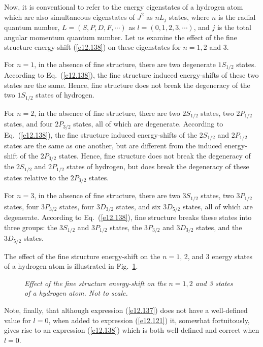 Now, it is conventional to refer to the energy eigenstates of a hydrogen
atom which are also simultaneous eigenstates of $J^2$ as $nL_j$ states,
where $n$ is the radial quantum number, $L=(S,P,D,F,\cdots)$ as $l=(0,1,2,3,\cdots)$, and $j$ is the total angular momentum quantum number.
Let us examine the effect of the fine structure energy-shift (\ref{e12.138})
on these eigenstates for  $n=1,2$ and 3.

For $n=1$, in the absence of fine structure, there are two degenerate $1S_{1/2}$ states. 
According to Eq.~(\ref{e12.138}), the fine structure induced energy-shifts of
these two states are the same. Hence, fine structure does not
break the degeneracy of the two $1S_{1/2}$ states of hydrogen. 

For $n=2$, in the absence of fine structure, there are two $2S_{1/2}$
states, two $2P_{1/2}$ states, and four $2P_{3/2}$ states, all
of which are degenerate.
According to Eq.~(\ref{e12.138}), the fine structure induced energy-shifts of
the $2S_{1/2}$ and $2P_{1/2}$ states are the same as one another, but are different
from the  induced
energy-shift of the $2P_{3/2}$ states.
Hence, fine structure does not break the
degeneracy of the $2S_{1/2}$ and $2P_{1/2}$ states of hydrogen, but
does break the degeneracy of these states relative to the $2P_{3/2}$
states.

 For $n=3$, in the absence of fine structure, there are two $3S_{1/2}$
states, two $3P_{1/2}$ states, four $3P_{3/2}$ states,  four $3D_{3/2}$
states, and six $3D_{5/2}$ states, all of
which are degenerate. According to Eq.~(\ref{e12.138}), fine structure
breaks these states into three groups: the $3S_{1/2}$ and $3P_{1/2}$ states,
the $3P_{3/2}$ and $3D_{3/2}$ states, and the $3D_{5/2}$ states.

The effect of the fine structure energy-shift on the $n=1$, 2, and 3 energy
states of a hydrogen atom is illustrated in Fig.~\ref{ffine}.

\begin{figure}
\epsfysize=3.5in
\centerline{}
\caption{\em Effect of the fine structure energy-shift on the
$n=1,2$ and 3 states of a hydrogen atom. Not to scale.}\label{ffine}   
\end{figure}

Note, finally, that although expression (\ref{e12.137}) does not
have a well-defined value for $l=0$, when added to expression (\ref{e12.121})  it, somewhat fortuitously, gives rise to an expression
(\ref{e12.138}) which is both well-defined and correct when $l=0$.

